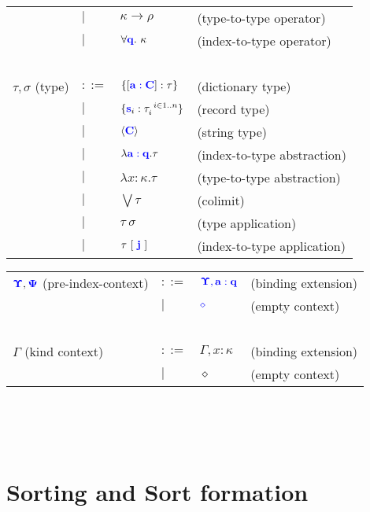 \documentclass{article}
\newcommand{\blu}[1]{\mathbf{\color{blue}{#1}}}
\begin{document}
\begin{tabular}{llll}
                     & $\mid$ & $\kappa \to \rho$ & (type-to-type operator)\\
                     & $\mid$ & $\forall \blu{q}.~\kappa$ & (index-to-type operator) \\~\\
$\tau,\sigma$ (type) & $::=$ & $\{[\blu{a : C}] : \tau \}$ & (dictionary type) \\ 
       & $\mid$ & $\{ \blu{s}_i : \tau_i^{~i \in 1..n} \}$ & (record type) \\
       & $\mid$ & $\langle \blu{C} \rangle$ & (string type) \\
       & $\mid$ & $\lambda \blu{a : q} . \tau$ & (index-to-type abstraction) \\
       & $\mid$ & $\lambda x : \kappa. \tau$ & (type-to-type abstraction) \\
       & $\mid$ & $\bigvee \tau$ & (colimit) \\
       & $\mid$ & $\tau~\sigma$ & (type application) \\
       & $\mid$ & $\tau~[~\blu{j}~]$ & (index-to-type application)
\end{tabular}

\begin{tabular}{llll}
$\blu{\Upsilon}, \blu{\Psi}$ (pre-index-context) & $::=$  & $\blu{\Upsilon,a : q}$ & (binding extension) \\
                                     & $\mid$ & $\blu{\diamond}$ & (empty context) \\ ~\\
$\Gamma$ (kind context) & $::=$ & $\Gamma,x : \kappa$ & (binding extension) \\
                        & $\mid$ & $\diamond$ & (empty context) 
\end{tabular}\\~\\~\\

\section*{Sorting and Sort formation}
\end{document}
